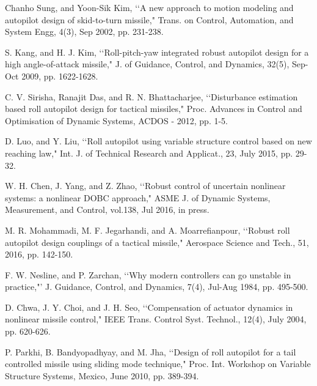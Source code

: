 \documentclass[conference]{IEEEtran}
\begin{document}
\begin{thebibliography}{1}

Chanho Sung, and Yoon-Sik Kim, \lq \lq A new approach to motion modeling and autopilot design of skid-to-turn missile," Trans. on Control, Automation, and System Engg, 4(3), Sep 2002, pp. 231-238. 

S. Kang, and H. J. Kim, \lq \lq Roll-pitch-yaw integrated robust autopilot design for a high angle-of-attack missile," J. of Guidance, Control, and Dynamics, 32(5), Sep-Oct 2009, pp. 1622-1628.

C. V. Sirisha, Ranajit Das, and R. N. Bhattacharjee, \lq \lq Disturbance estimation based roll autopilot design for tactical missiles," Proc. Advances in Control and Optimisation of Dynamic Systems, ACDOS - 2012, pp. 1-5.

D. Luo, and Y. Liu, \lq \lq Roll autopilot using variable structure control based on new reaching law," Int. J. of Technical Research and Applicat., 23, July 2015, pp. 29-32.

W. H. Chen, J. Yang, and Z. Zhao, \lq \lq Robust control of uncertain nonlinear systems: a nonlinear DOBC approach," ASME J. of Dynamic Systems, Measurement, and Control, vol.138, Jul 2016, in press.

M. R. Mohammadi, M. F. Jegarhandi, and A. Moarrefianpour, \lq \lq Robust roll autopilot design couplings of a tactical missile," Aerospace Science and Tech., 51, 2016, pp. 142-150.

F. W. Nesline, and P. Zarchan, \lq \lq Why modern controllers can go unstable in practice,"' J. Guidance, Control, and Dynamics, 7(4), Jul-Aug 1984, pp. 495-500.

D. Chwa, J. Y. Choi, and J. H. Seo, \lq \lq Compensation of actuator dynamics in nonlinear missile control," IEEE Trans. Control Syst. Technol., 12(4), July 2004, pp. 620-626.

P. Parkhi, B. Bandyopadhyay, and M. Jha, \lq \lq Design of roll autopilot for a tail controlled missile using sliding mode technique," Proc. Int. Workshop on Variable Structure Systems, Mexico, June 2010, pp. 389-394.


\end{thebibliography}
\end{document}
